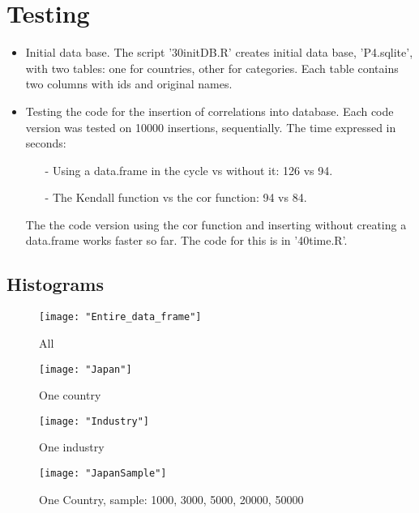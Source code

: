 \documentclass[a4paper]{article}
\begin{document}
\section{Testing}
\begin{itemize}
\item Initial data base. The script '30initDB.R' creates initial data
  base, 'P4.sqlite', with two tables: one for countries, other for
  categories. Each table contains two columns with ids and original
  names.
\item Testing the code for the insertion of correlations into
  database. Each code version was tested on 10000 insertions,
  sequentially. The time expressed in seconds:
  \begin{itemize}
    \item[-] Using a data.frame in the cycle vs without it: 126 vs
      94.
    \item[-] The Kendall function vs the cor function: 94 vs 84.
  \end{itemize}
The the code version using the cor function and inserting without
creating a data.frame works faster so far. The code for this is in '40time.R'.

\end{itemize}

\subsection{Histograms}

\begin{figure}[H]
\begin{center}
\texttt{[image: "Entire\_data\_frame"]}
\caption{All}
\label{fig:2}
\end{center}
\end{figure}


\begin{figure}[H]
\begin{center}
\texttt{[image: "Japan"]}
\caption{One country}
\label{fig:2}
\end{center}
\end{figure}

\begin{figure}[H]
\begin{center}
\texttt{[image: "Industry"]}
\caption{One industry}
\label{fig:2}
\end{center}
\end{figure}

\begin{figure}[H]
\begin{center}
\texttt{[image: "JapanSample"]}
\caption{One Country, sample: 1000, 3000, 5000, 20000, 50000}
\label{fig:2}
\end{center}
\end{figure}
\end{document}

